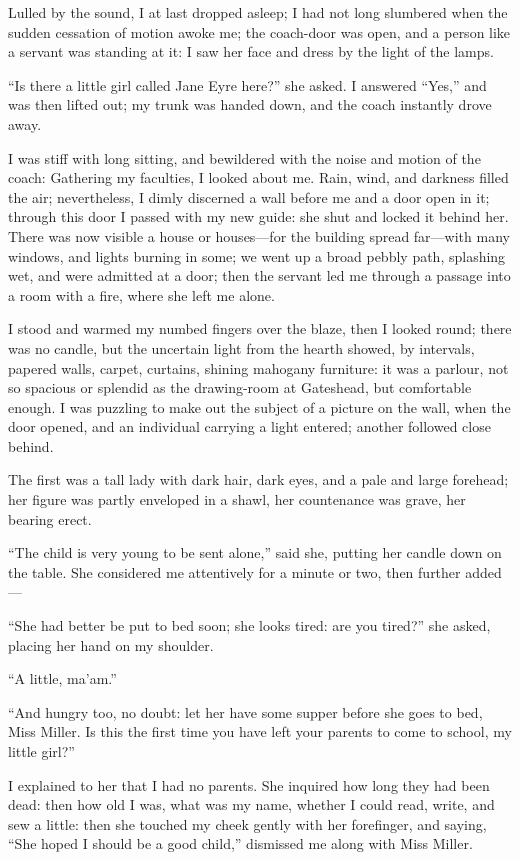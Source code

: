 Lulled by the sound, I at last dropped asleep; I had not long slumbered
when the sudden cessation of motion awoke me; the coach-door was open,
and a person like a servant was standing at it: I saw her face and dress
by the light of the lamps.

\enquote{Is there a little girl called Jane Eyre here?} she asked. I
answered \enquote{Yes,} and was then lifted out; my trunk was handed
down, and the coach instantly drove away.

I was stiff with long sitting, and bewildered with the noise and motion
of the coach: Gathering my faculties, I looked about me. Rain, wind,
and darkness filled the air; nevertheless, I dimly discerned a wall
before me and a door open in it; through this door I passed with my new
guide: she shut and locked it behind her. There was now visible a house
or houses---for the building spread far---with many windows, and lights
burning in some; we went up a broad pebbly path, splashing wet, and were
admitted at a door; then the servant led me through a passage into a
room with a fire, where she left me alone.

I stood and warmed my numbed fingers over the blaze, then I looked
round; there was no candle, but the uncertain light from the hearth
showed, by intervals, papered walls, carpet, curtains, shining mahogany
furniture: it was a parlour, not so spacious or splendid as the
drawing-room at Gateshead, but comfortable enough. I was puzzling to
make out the subject of a picture on the wall, when the door opened, and
an individual carrying a light entered; another followed close behind.

The first was a tall lady with dark hair, dark eyes, and a pale and
large forehead; her figure was partly enveloped in a shawl, her
countenance was grave, her bearing erect.

\enquote{The child is very young to be sent alone,} said she, putting
her candle down on the table. She considered me attentively for a
minute or two, then further added---

\enquote{She had better be put to bed soon; she looks tired: are you
	tired?} she asked, placing her hand on my shoulder.

\enquote{A little, ma'am.}

\enquote{And hungry too, no doubt: let her have some supper before she
	goes to bed, Miss Miller. Is this the first time you have left your
	parents to come to school, my little girl?}

I explained to her that I had no parents. She inquired how long they
had been dead: then how old I was, what was my name, whether I could
read, write, and sew a little: then she touched my cheek gently with her
forefinger, and saying, \enquote{She hoped I should be a good child,}
dismissed me along with Miss Miller.

